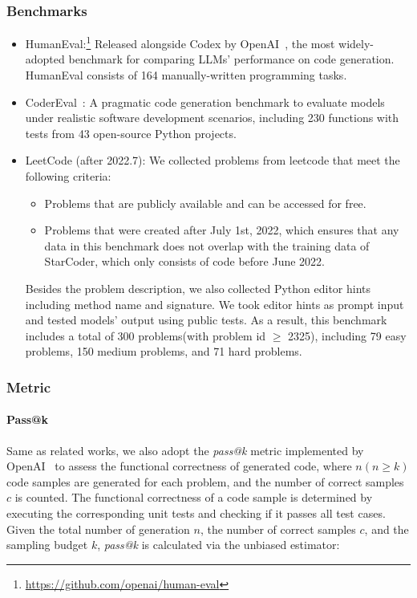 \documentclass{article}
\begin{document}
\subsubsection{Benchmarks}
\begin{itemize}
    \item HumanEval:\footnote{\url{https://github.com/openai/human-eval}} Released alongside Codex by OpenAI~\cite{codex}, the most widely-adopted benchmark for comparing LLMs' performance on code generation. HumanEval consists of 164 manually-written programming tasks.
    \item CoderEval~\cite{codereval}: A pragmatic code generation benchmark to evaluate models under realistic software development scenarios, including 230 functions with tests from 43 open-source Python projects.
    \item LeetCode (after 2022.7): We collected problems from leetcode that meet the following criteria:
    \begin{itemize}
        \item Problems that are publicly available and can be accessed for free.
        \item Problems that were created after July 1st, 2022, which ensures that any data in this benchmark does not overlap with the training data of StarCoder, which only consists of code before June 2022.
    \end{itemize}
        Besides the problem description, we also collected Python editor hints including method name and signature. We took editor hints as prompt input and tested models' output using public tests.
        As a result, this benchmark includes a total of 300 problems(with problem id $\geq$ 2325), including 79 easy problems, 150 medium problems, and 71 hard problems.
\end{itemize}

\subsubsection{Metric}

\paragraph{Pass@k} Same as related works, we also adopt the \textit{pass@k} metric implemented by OpenAI~\cite{codex} to assess the functional correctness of generated code, where $n (n \geq k)$ code samples are generated for each problem, and the number of correct samples $c$ is counted. The functional correctness of a code sample is determined by executing the corresponding unit tests and checking if it passes all test cases. Given the total number of generation $n$, the number of correct samples $c$, and the sampling budget $k$, \textit{pass@k} is calculated via the unbiased estimator:
\end{document}
